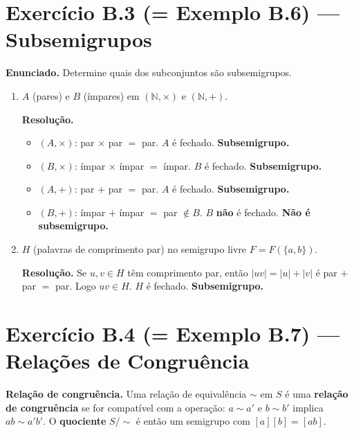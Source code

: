 \documentclass[12pt,a4paper]{article}
\newcommand{\keyword}[1]{\textbf{\textcolor{azul}{#1}}}
\begin{document}
\section*{Exercício B.3 (= Exemplo B.6) — Subsemigrupos}

\textbf{Enunciado.} Determine quais dos subconjuntos são subsemigrupos.

\begin{enumerate}[label=(\alph*)]
  \item $A$ (pares) e $B$ (ímpares) em $(\mathbb{N}, \times)$ e $(\mathbb{N}, +)$.

  \medskip
  \textbf{Resolução.}
  \begin{itemize}
    \item $(A, \times)$: par $\times$ par $=$ par. $A$ é fechado. \textbf{Subsemigrupo.}
    \item $(B, \times)$: ímpar $\times$ ímpar $=$ ímpar. $B$ é fechado. \textbf{Subsemigrupo.}
    \item $(A, +)$: par $+$ par $=$ par. $A$ é fechado. \textbf{Subsemigrupo.}
    \item $(B, +)$: ímpar $+$ ímpar $=$ par $\notin B$. $B$ \textbf{não} é fechado.
          \textbf{Não é subsemigrupo.}
  \end{itemize}

  \item $H$ (palavras de comprimento par) no semigrupo livre $F = F(\{a,b\})$.

  \medskip
  \textbf{Resolução.} Se $u, v \in H$ têm comprimento par, então $|uv| = |u| + |v|$
  é par $+$ par $=$ par. Logo $uv \in H$. $H$ é fechado. \textbf{Subsemigrupo.}
\end{enumerate}

\section*{Exercício B.4 (= Exemplo B.7) — Relações de Congruência}

\begin{teoriacaixa}
\textbf{Relação de congruência.} Uma relação de equivalência $\sim$ em $S$ é uma
\keyword{relação de congruência} se for compatível com a operação:
$a \sim a'$ e $b \sim b'$ implica $ab \sim a'b'$.
O \keyword{quociente} $S/{\sim}$ é então um semigrupo com $[a][b] = [ab]$.
\end{teoriacaixa}
\end{document}
